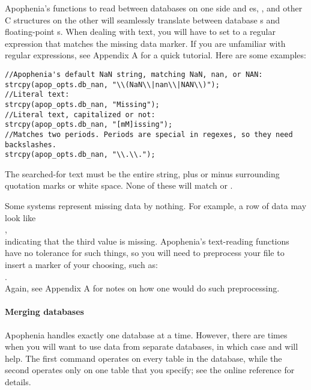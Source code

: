 Apophenia's functions to read between databases on one side and
es, , and other C structures on the
other will seamlessly translate between database s and
floating-point s. When dealing with text, you will have
to set  to a regular expression that matches the
missing data marker. If you are unfamiliar with regular expressions, see
Appendix A for a quick tutorial. Here are some examples:
\begin{lstlisting}
//Apophenia's default NaN string, matching NaN, nan, or NAN:
strcpy(apop_opts.db_nan, "\\(NaN\\|nan\\|NAN\\)");
//Literal text:
strcpy(apop_opts.db_nan, "Missing");
//Literal text, capitalized or not:
strcpy(apop_opts.db_nan, "[mM]issing");
//Matches two periods. Periods are special in regexes, so they need backslashes.
strcpy(apop_opts.db_nan, "\\.\\.");
\end{lstlisting}
The searched-for text must be the entire string, plus or minus
surrounding quotation marks or white space. None of these will match
 or .

Some systems represent missing data by nothing. For example, a row of
data may look like\\
,\\
indicating that the third value is missing. Apophenia's text-reading
functions have no tolerance for such things, so you will need to
preprocess your file to insert a marker of your choosing, such as:\\
.\\
Again, see Appendix A for notes on how one would do such preprocessing.


\paragraph{Merging databases} Apophenia handles exactly one database at
a time. However, there are times when you will want to use data
from separate databases, in which case  and
 will help.  The first command
operates on every table in the database, while the second operates only
on one table that you specify; see the online reference for details.

